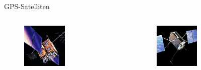 \begin{frame}{GPS-Satelliten}
    \begin{columns}
        \begin{column}{0.5\textwidth}
            \begin{figure}
                \includegraphics[width=0.5\textwidth]{images/IIR.jpg}
            \end{figure}
        \end{column}
        \begin{column}{0.5\textwidth}
            \begin{figure}
                \includegraphics[width=0.5\textwidth]{images/IIIA.jpg}
            \end{figure}
        \end{column}
    \end{columns}
\end{frame}
